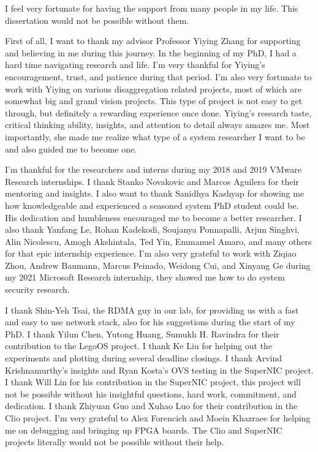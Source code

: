 \begin{acknowledgements}

I feel very fortunate for having the support from many people in my life.
This dissertation would not be possible without them.

First of all, I want to thank my advisor Professor Yiying Zhang for supporting and believing in me during this journey.
In the beginning of my PhD, I had a hard time navigating research and life. I'm very thankful for Yiying's encouragement, trust, and patience during that period.
I'm also very fortunate to work with Yiying on various disaggregation related projects, most of which are somewhat big and grand vision projects.
This type of project is not easy to get through,
but definitely a rewarding experience once done.
Yiying's research taste, critical thinking ability, insights, and attention to detail always amazes me.
Most importantly, she made me realize what type of  a system researcher I want to be and also guided me to become one.

I'm thankful for the researchers and interns during my 2018 and 2019 VMware Research internships.
I thank Stanko Novakovic and Marcos Aguilera for their mentoring and insights.
I also want to thank Sanidhya Kashyap for showing me how knowledgeable and experienced a seasoned system PhD student could be. His dedication and humbleness encouraged me to become a better researcher.
I also thank Yanfang Le, Rohan Kadekodi, Soujanya Ponnapalli, Arjun Singhvi, Alin Nicolescu, Amogh Akshintala, Ted Yin, Emmanuel Amaro, and many others for that epic internship experience.
I'm also very grateful to work with Ziqiao Zhou, Andrew Baumann, Marcus Peinado, Weidong Cui, and Xinyang Ge during my 2021 Microsoft Research internship, they showed me how to do system security research.

I thank Shin-Yeh Tsai, the RDMA guy in our lab, for providing us with a fast and easy to use network stack, also for his suggestions during the start of my PhD.
I thank Yilun Chen, Yutong Huang, Sumukh H. Ravindra for their contribution to the LegoOS project.
I thank Ke Liu for helping out the experiments and plotting during several deadline closings.
I thank Arvind Krishnamurthy's insights and Ryan Kosta's OVS testing in the SuperNIC project.
I thank Will Lin for his contribution in the SuperNIC project,
this project will not be possible without his insightful questions, hard work, commitment, and dedication.
I thank Zhiyuan Guo and Xuhao Luo for their contribution in the Clio project.
I'm very grateful to Alex Forencich and Moein Khazraee for helping me on debugging and bringing up FPGA boards.
The Clio and SuperNIC projects literally would not be possible without their help.


\end{acknowledgements}
